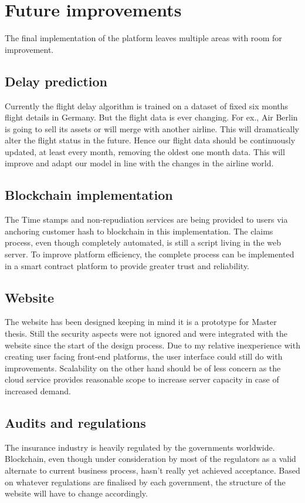 \section{Future improvements}
The final implementation of the platform leaves multiple areas with room for improvement. 
\subsection{Delay prediction}
Currently the flight delay algorithm is trained on a dataset of fixed six months flight details in Germany. But the flight data is ever changing. For ex., Air Berlin is going to sell its assets or will merge with another airline. This will dramatically alter the flight status in the future. Hence our flight data should be continuously updated, at least every month, removing the oldest one month data. This will improve and adapt our model in line with the changes in the airline world.

\subsection{Blockchain implementation}
The Time stamps and non-repudiation services are being provided to users via anchoring customer hash to blockchain in this implementation. The claims process, even though completely automated, is still a script living in the web server. To improve platform efficiency, the complete process can be implemented in a smart contract platform to provide greater trust and reliability.

\subsection{Website}
The website has been designed keeping in mind it is a prototype for Master thesis. Still the security aspects were not ignored and were integrated with the website since the start of the design process. Due to my relative inexperience with creating user facing front-end platforms, the user interface could still do with improvements. Scalability on the other hand should be of less concern as the cloud service provides reasonable scope to increase server capacity in case of increased demand.

\subsection{Audits and regulations}
The insurance industry is heavily regulated by the governments worldwide. Blockchain, even though under consideration by most of the regulators as a valid alternate to current business process, hasn't really yet achieved acceptance. Based on whatever regulations are finalised by each government, the structure of the website will have to change accordingly.

